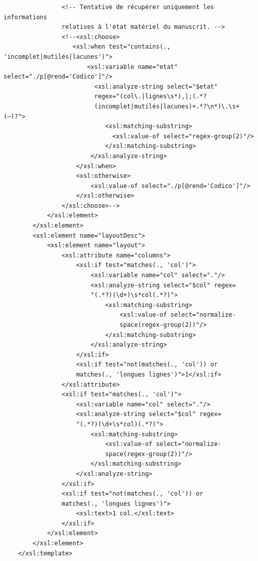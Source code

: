\documentclass[a4paper,12pt,twoside]{book}
\begin{document}
\begin{verbatim}
                <!-- Tentative de récupérer uniquement les informations 
                relatives à l'état matériel du manuscrit. -->
                <!--<xsl:choose>
                   <xsl:when test="contains(., 'incomplet|mutilés|lacunes')">
                       <xsl:variable name="etat" select="./p[@rend='Codico']"/>
                         <xsl:analyze-string select="$etat" 
                         regex="(col\.|lignes\s*),|;(.*?
                         (incomplet|mutilés|lacunes)+.*?\n*)\.\s+(—)?">
                            <xsl:matching-substring>
                              <xsl:value-of select="regex-group(2)"/>    
                            </xsl:matching-substring>
                        </xsl:analyze-string>
                    </xsl:when>
                    <xsl:otherwise>
                        <xsl:value-of select="./p[@rend='Codico']"/>
                    </xsl:otherwise>
                </xsl:choose>-->
            </xsl:element>
        </xsl:element>
        <xsl:element name="layoutDesc">
            <xsl:element name="layout">
                <xsl:attribute name="columns">
                    <xsl:if test="matches(., 'col')">
                        <xsl:variable name="col" select="."/>
                        <xsl:analyze-string select="$col" regex=
                        "(.*?)(\d+)\s*col(.*?)">
                            <xsl:matching-substring>
                                <xsl:value-of select="normalize-
                                space(regex-group(2))"/>
                            </xsl:matching-substring>
                        </xsl:analyze-string>
                    </xsl:if>
                    <xsl:if test="not(matches(., 'col')) or 
                    matches(., 'longues lignes')">1</xsl:if>
                </xsl:attribute>
                <xsl:if test="matches(., 'col')">
                    <xsl:variable name="col" select="."/>
                    <xsl:analyze-string select="$col" regex=
                    "(.*?)(\d+\s*col)(.*?)">
                        <xsl:matching-substring>
                            <xsl:value-of select="normalize-
                            space(regex-group(2))"/>
                        </xsl:matching-substring>
                    </xsl:analyze-string>
                </xsl:if>
                <xsl:if test="not(matches(., 'col')) or 
                matches(., 'longues lignes')">
                    <xsl:text>1 col.</xsl:text>
                </xsl:if>
            </xsl:element>
        </xsl:element>
    </xsl:template>


\end{verbatim}
\end{document}
